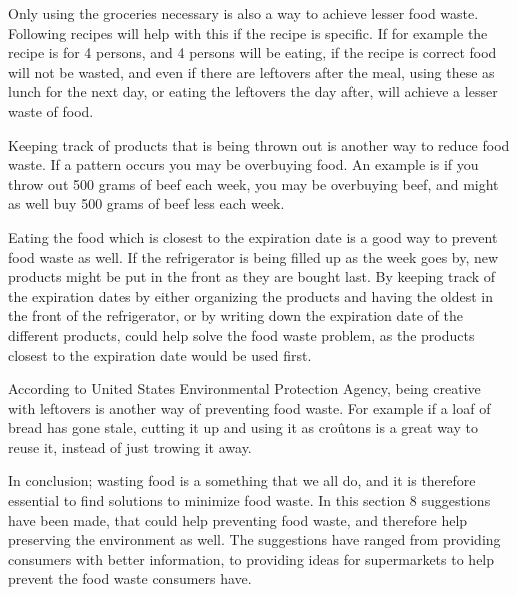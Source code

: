 Only using the groceries necessary is also a way to achieve lesser food waste. Following recipes will help with this if the recipe is specific. If for example the recipe is for 4 persons, and 4 persons will be eating, if the recipe is correct food will not be wasted, and even if there are leftovers after the meal, using these as lunch for the next day, or eating the leftovers the day after, will achieve a lesser waste of food. %

Keeping track of products that is being thrown out is another way to reduce food waste. If a pattern occurs you may be overbuying food. An example is if you throw out 500 grams of beef each week, you may be overbuying beef, and might as well buy 500 grams of beef less each week. %

Eating the food which is closest to the expiration date is a good way to prevent food waste as well. If the refrigerator is being filled up as the week goes by, new products might be put in the front as they are bought last. By keeping track of the expiration dates by either organizing the products and having the oldest in the front of the refrigerator, or by writing down the expiration date of the different products, could help solve the food waste problem, as the products closest to the expiration date would be used first. 

According to United States Environmental Protection Agency, being creative with leftovers is another way of preventing food waste. For example if a loaf of bread has gone stale, cutting it up and using it as croûtons is a great way to reuse it, instead of just trowing it away. %

In conclusion; wasting food is a something that we all do, and it is therefore essential to find solutions to minimize food waste. In this section 8 suggestions have been made, that could help preventing food waste, and therefore help preserving the environment as well. The suggestions have ranged from providing consumers with better information, to providing ideas for supermarkets to help prevent the food waste consumers have.